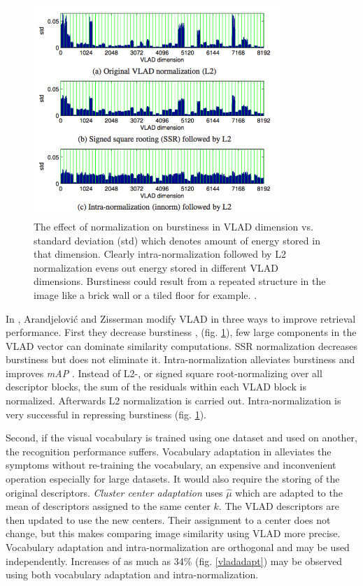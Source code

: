 \documentclass[english,12pt,a4paper,pdftex,elec,utf8]{aaltothesis}
\begin{document}
\begin{figure}[htb]
\begin{center}
\includegraphics[height=8cm]{figures/vladnorm}
\end{center}
\caption{The effect of normalization on burstiness in VLAD dimension vs. standard deviation (std) which denotes amount of energy stored in that dimension. Clearly intra-normalization followed by L2 normalization evens out energy stored in different VLAD dimensions. Burstiness could result from a repeated structure in the image like a brick wall or a tiled floor for example. \cite{Arandjelovic2013}.}
\label{vladburstiness}
\end{figure}

In \cite{Arandjelovic2013}, Arandjelovi\'{c} and Zisserman modify VLAD in three ways to improve retrieval performance. First they decrease burstiness \cite{Jegou2009}, \cite{Delhumeau2013} (fig. \ref{vladburstiness}), few large components in the VLAD vector can dominate similarity computations. SSR normalization decreases burstiness but does not eliminate it. Intra-normalization alleviates burstiness and improves \emph{mAP} \cite{Arandjelovic2013}. Instead of L2-, or signed square root-normalizing over all descriptor blocks, the sum of the residuals within each VLAD block is normalized. Afterwards L2 normalization is carried out. Intra-normalization is very successful in repressing burstiness (fig. \ref{vladburstiness}).

Second, if the visual vocabulary is trained using one dataset and used on another, the recognition performance suffers. Vocabulary adaptation in \cite{Arandjelovic2013} alleviates the symptoms without re-training the vocabulary, an expensive and inconvenient operation especially for large datasets. It would also require the storing of the original descriptors. \emph{Cluster center adaptation} uses $\hat{\mu}$ which are adapted to the mean of descriptors assigned to the same center $k$. The VLAD descriptors are then updated to use the new centers. Their assignment to a center does not change, but this makes comparing image similarity using VLAD more precise. Vocabulary adaptation and intra-normalization are orthogonal and may be used independently. Increases of as much as 34\% (fig. \ref{vladadapt}) may be observed using both vocabulary adaptation and intra-normalization. \cite{Arandjelovic2013}
\end{document}
